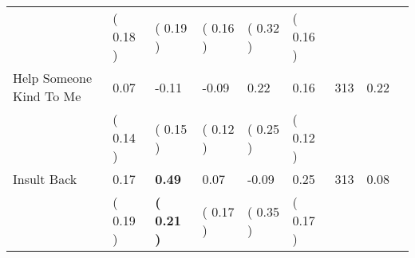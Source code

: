 \begin{tabular}{L{6.2cm} C{1.8cm} C{1.8cm} C{1.8cm} C{1.8cm} C{1.8cm} C{1.8cm} C{0.3cm} C{0.3cm}}
 & (     0.18 ) & (     0.19 ) & (     0.16 ) & (     0.32 ) & (     0.16 )  & \\
Help Someone Kind To Me &      0.07 &     -0.11 &     -0.09 &      0.22 &      0.16  & 313 &       0.22 \\ 
 & (     0.14 ) & (     0.15 ) & (     0.12 ) & (     0.25 ) & (     0.12 )  & \\
Insult Back &      0.17 & \textbf{     0.49} &      0.07 &     -0.09 &      0.25  & 313 &       0.08 \\ 
 & (     0.19 ) & \textbf{(     0.21 )} & (     0.17 ) & (     0.35 ) & (     0.17 )  & \\
\bottomrule
\end{tabular}
